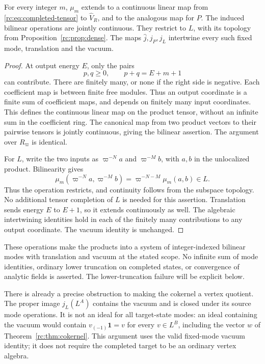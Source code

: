 \begin{proposition}
\label{rc:prop:modes}
For every integer \(m\), \(\mu_m\) extends to a continuous
linear map from \eqref{rc:eq:completed-tensor} to
\(\widehat V_R\), and to the analogous map for \(P\).
The induced bilinear operations are jointly continuous.
They restrict to \(L\), with its topology from
Proposition~\ref{rc:prop:dense}.
The maps \(\widehat j,j_P,j_L\) intertwine every such fixed
mode, translation and the vacuum.
\end{proposition}
\begin{proof}
At output energy \(E\), only the pairs
\[
 p,q\geq0,\qquad p+q=E+m+1
\]
can contribute.  There are finitely many, or none if the
right side is negative.  Each coefficient map is between
finite free modules.  Thus an output coordinate is a finite
sum of coefficient maps, and depends on finitely many input
coordinates.  This defines the continuous linear map on the
product tensor, without an infinite sum in the coefficient
ring.  The canonical map from two product vectors to their
pairwise tensors is jointly continuous, giving the bilinear
assertion.  The argument over \(R_\varpi\) is identical.

For \(L\), write the two inputs as \(\varpi^{-N}a\) and
\(\varpi^{-M}b\), with \(a,b\) in the unlocalized product.
Bilinearity gives
\[
 \mu_m(\varpi^{-N}a,\varpi^{-M}b)
     =\varpi^{-N-M}\mu_m(a,b)\in L.
\]
Thus the operation restricts, and continuity follows from
the subspace topology.  No additional tensor completion
of \(L\) is needed for this assertion.
Translation sends energy \(E\) to \(E+1\), so it extends
continuously as well.  The algebraic intertwining identities
hold in each of the finitely many contributions to any
output coordinate.  The vacuum identity is unchanged.
\end{proof}

These operations make the products into a system of
integer-indexed bilinear modes with translation and vacuum
at the stated scope.  No infinite sum of mode identities,
ordinary lower truncation on completed states, or convergence
of analytic fields is asserted.  The lower-truncation
failure will be explicit below.

There is already a precise obstruction to making the
cokernel a vertex quotient.  The proper image \(j_L(L^A)\)
contains the vacuum and is closed under its source mode
operations.  It is not an ideal for all target-state modes:
an ideal containing the vacuum would contain
\(v_{(-1)}\mathbf1=v\) for every \(v\in L^B\), including
the vector \(w\) of Theorem~\ref{rc:thm:cokernel}.
This argument uses the valid fixed-mode vacuum identity;
it does not require the completed target to be an ordinary
vertex algebra.

